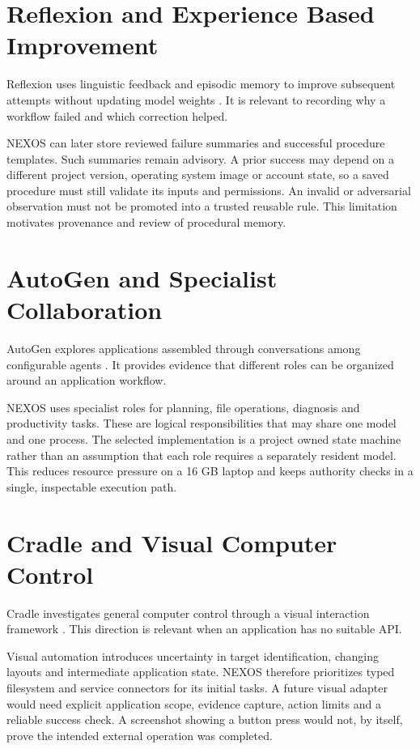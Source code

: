 \section{Reflexion and Experience Based Improvement}
Reflexion uses linguistic feedback and episodic memory to improve subsequent attempts without updating model weights \cite{reflexion}. It is relevant to recording why a workflow failed and which correction helped.

NEXOS can later store reviewed failure summaries and successful procedure templates. Such summaries remain advisory. A prior success may depend on a different project version, operating system image or account state, so a saved procedure must still validate its inputs and permissions. An invalid or adversarial observation must not be promoted into a trusted reusable rule. This limitation motivates provenance and review of procedural memory.

\section{AutoGen and Specialist Collaboration}
AutoGen explores applications assembled through conversations among configurable agents \cite{autogen}. It provides evidence that different roles can be organized around an application workflow.

NEXOS uses specialist roles for planning, file operations, diagnosis and productivity tasks. These are logical responsibilities that may share one model and one process. The selected implementation is a project owned state machine rather than an assumption that each role requires a separately resident model. This reduces resource pressure on a 16 GB laptop and keeps authority checks in a single, inspectable execution path.

\section{Cradle and Visual Computer Control}
Cradle investigates general computer control through a visual interaction framework \cite{cradle}. This direction is relevant when an application has no suitable API.

Visual automation introduces uncertainty in target identification, changing layouts and intermediate application state. NEXOS therefore prioritizes typed filesystem and service connectors for its initial tasks. A future visual adapter would need explicit application scope, evidence capture, action limits and a reliable success check. A screenshot showing a button press would not, by itself, prove the intended external operation was completed.

